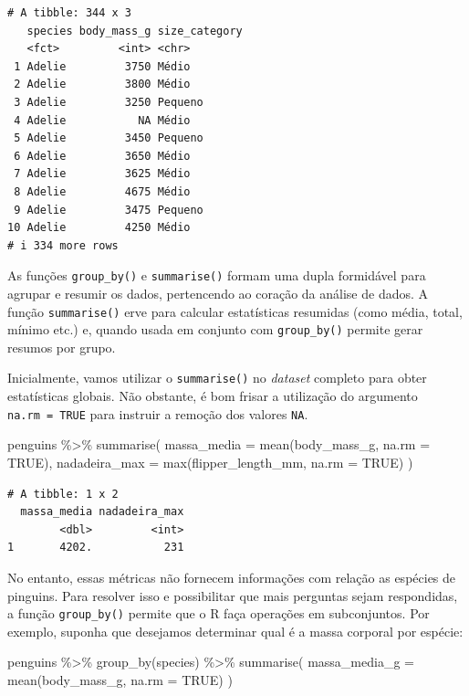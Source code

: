 \documentclass[
  12pt,
  letterpaper,
  DIV=11,
  numbers=noendperiod]{scrreprt}
\newenvironment{Shaded}{\begin{snugshade}}{\end{snugshade}}
\newcommand{\AttributeTok}[1]{\textcolor[rgb]{0.40,0.45,0.13}{#1}}
\newcommand{\ConstantTok}[1]{\textcolor[rgb]{0.56,0.35,0.01}{#1}}
\newcommand{\FunctionTok}[1]{\textcolor[rgb]{0.28,0.35,0.67}{#1}}
\newcommand{\NormalTok}[1]{\textcolor[rgb]{0.00,0.23,0.31}{#1}}
\newcommand{\SpecialCharTok}[1]{\textcolor[rgb]{0.37,0.37,0.37}{#1}}
\theoremstyle{definition}
\theoremstyle{exemplo}
\begin{document}
\begin{verbatim}
# A tibble: 344 x 3
   species body_mass_g size_category
   <fct>         <int> <chr>        
 1 Adelie         3750 Médio        
 2 Adelie         3800 Médio        
 3 Adelie         3250 Pequeno      
 4 Adelie           NA Médio        
 5 Adelie         3450 Pequeno      
 6 Adelie         3650 Médio        
 7 Adelie         3625 Médio        
 8 Adelie         4675 Médio        
 9 Adelie         3475 Pequeno      
10 Adelie         4250 Médio        
# i 334 more rows
\end{verbatim}

As funções \texttt{group\_by()} e \texttt{summarise()} formam uma dupla
formidável para agrupar e resumir os dados, pertencendo ao coração da
análise de dados. A função \texttt{summarise()} erve para calcular
estatísticas resumidas (como média, total, mínimo etc.) e, quando usada
em conjunto com \texttt{group\_by()} permite gerar resumos por grupo.

Inicialmente, vamos utilizar o \texttt{summarise()} no \emph{dataset}
completo para obter estatísticas globais. Não obstante, é bom frisar a
utilização do argumento \texttt{na.rm\ =\ TRUE} para instruir a remoção
dos valores \texttt{NA}.

\begin{Shaded}
\begin{Highlighting}[]
\NormalTok{penguins }\SpecialCharTok{\%\textgreater{}\%} 
  \FunctionTok{summarise}\NormalTok{(}
    \AttributeTok{massa\_media =} \FunctionTok{mean}\NormalTok{(body\_mass\_g, }\AttributeTok{na.rm =} \ConstantTok{TRUE}\NormalTok{),}
    \AttributeTok{nadadeira\_max =} \FunctionTok{max}\NormalTok{(flipper\_length\_mm, }\AttributeTok{na.rm =} \ConstantTok{TRUE}\NormalTok{)}
\NormalTok{  )}
\end{Highlighting}
\end{Shaded}

\begin{verbatim}
# A tibble: 1 x 2
  massa_media nadadeira_max
        <dbl>         <int>
1       4202.           231
\end{verbatim}

No entanto, essas métricas não fornecem informações com relação as
espécies de pinguins. Para resolver isso e possibilitar que mais
perguntas sejam respondidas, a função \texttt{group\_by()} permite que o
R faça operações em subconjuntos. Por exemplo, suponha que desejamos
determinar qual é a massa corporal por espécie:

\begin{Shaded}
\begin{Highlighting}[]
\NormalTok{penguins }\SpecialCharTok{\%\textgreater{}\%} 
  \FunctionTok{group\_by}\NormalTok{(species) }\SpecialCharTok{\%\textgreater{}\%} 
  \FunctionTok{summarise}\NormalTok{(}
    \AttributeTok{massa\_media\_g =} \FunctionTok{mean}\NormalTok{(body\_mass\_g, }\AttributeTok{na.rm =} \ConstantTok{TRUE}\NormalTok{)}
\NormalTok{  )}
\end{Highlighting}
\end{Shaded}
\end{document}
